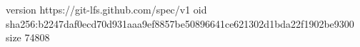 version https://git-lfs.github.com/spec/v1
oid sha256:b2247daf0ecd70d931aaa9ef8857be50896641ce621302d1bda22f1902be9300
size 74808
